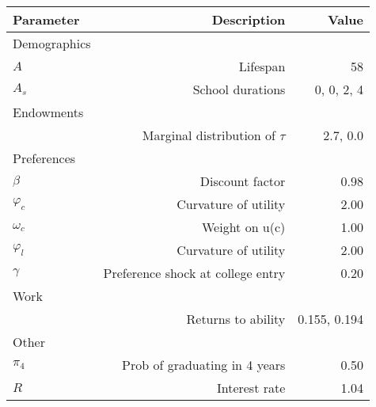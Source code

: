 \begin{tabular}{lrr}
\hline
Parameter & Description  & Value  \\ 
\hline
Demographics &   &   \\ 
$A$ & Lifespan  & 58  \\ 
$A_{s}$ & School durations  & 0, 0, 2, 4  \\ 
Endowments &   &   \\ 
 & Marginal distribution of $\tau$  & 2.7, 0.0  \\ 
Preferences &   &   \\ 
$\beta$ & Discount factor  & 0.98  \\ 
$\varphi_{c}$ & Curvature of utility  & 2.00  \\ 
$\omega_{c}$ & Weight on u(c)  & 1.00  \\ 
$\varphi_{l}$ & Curvature of utility  & 2.00  \\ 
$\gamma$ & Preference shock at college entry  & 0.20  \\ 
Work &   &   \\ 
 & Returns to ability  & 0.155, 0.194  \\ 
Other &   &   \\ 
$\pi_{4}$ & Prob of graduating in 4 years  & 0.50  \\ 
$R$ & Interest rate  & 1.04  \\ 
\hline
\end{tabular}%
